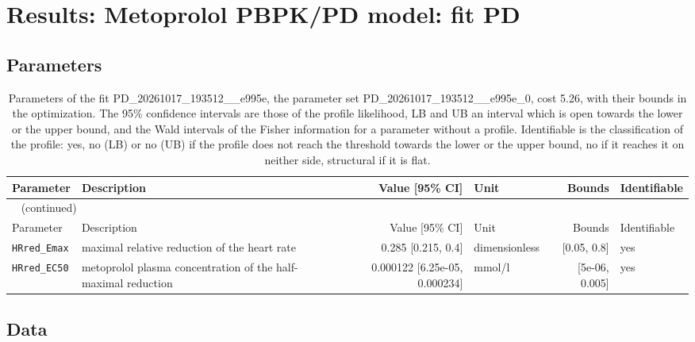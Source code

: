 \section{Results: Metoprolol PBPK/PD model: fit PD}

\subsection{Parameters}

\begin{longtable}{llrlrl}
\caption{Parameters of the fit PD\_20261017\_193512\_\_e995e, the parameter set PD\_20261017\_193512\_\_e995e\_0, cost 5.26, with their bounds in the optimization. The 95\% confidence intervals are those of the profile likelihood, LB and UB an interval which is open towards the lower or the upper bound, and the Wald intervals of the Fisher information for a parameter without a profile. Identifiable is the classification of the profile: yes, no (LB) or no (UB) if the profile does not reach the threshold towards the lower or the upper bound, no if it reaches it on neither side, structural if it is flat.}\label{tab:parameters:PD_20261017_193512__e995e} \\
\toprule
Parameter & Description & Value [95\% CI] & Unit & Bounds & Identifiable \\
\midrule
\endfirsthead
\multicolumn{6}{l}{\small\tablename~\thetable{} (continued)} \\
\toprule
Parameter & Description & Value [95\% CI] & Unit & Bounds & Identifiable \\
\midrule
\endhead
\bottomrule
\endlastfoot
\texttt{HRred\_Emax} & maximal relative reduction of the heart rate & 0.285 [0.215, 0.4] & dimensionless & [0.05, 0.8] & yes \\
\texttt{HRred\_EC50} & metoprolol plasma concentration of the half-maximal reduction & 0.000122 [6.25e-05, 0.000234] & mmol/l & [5e-06, 0.005] & yes \\
\end{longtable}

\subsection{Data}

